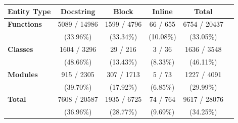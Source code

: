 \begin{tabular}{lccccc}
\hline
\textbf{Entity Type} & \textbf{Docstring} & \textbf{Block} & \textbf{Inline} & \textbf{Total} \\
\hline
\textbf{Functions} & 5089 / 14986 & 1599 / 4796 & 66 / 655 & 6754 / 20437 \\
 & (33.96\%) & (33.34\%) & (10.08\%) & (33.05\%) \\
\hline
\textbf{Classes} & 1604 / 3296 & 29 / 216 & 3 / 36 & 1636 / 3548 \\
 & (48.66\%) & (13.43\%) & (8.33\%) & (46.11\%) \\
\hline
\textbf{Modules} & 915 / 2305 & 307 / 1713 & 5 / 73 & 1227 / 4091 \\
 & (39.70\%) & (17.92\%) & (6.85\%) & (29.99\%) \\
\hline
\textbf{Total} & 7608 / 20587 & 1935 / 6725 & 74 / 764 & 9617 / 28076 \\
 & (36.96\%) & (28.77\%) & (9.69\%) & (34.25\%) \\
\hline
\end{tabular}